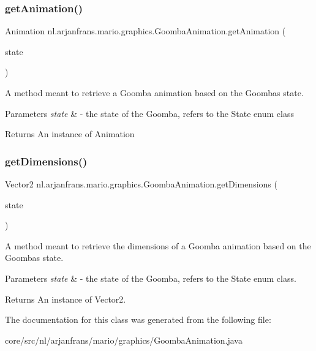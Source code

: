 \subsubsection{\texorpdfstring{get\+Animation()}{getAnimation()}}
{\footnotesize\ttfamily Animation nl.\+arjanfrans.\+mario.\+graphics.\+Goomba\+Animation.\+get\+Animation (\begin{DoxyParamCaption}\item[{State}]{state }\end{DoxyParamCaption})}



A method meant to retrieve a Goomba animation based on the Goomba\textquotesingle{}s state. 


\begin{DoxyParams}{Parameters}
{\em state} & -\/ the state of the Goomba, refers to the State enum class \\
\hline
\end{DoxyParams}
\begin{DoxyReturn}{Returns}
An instance of Animation 
\end{DoxyReturn}
\mbox{\label{classnl_1_1arjanfrans_1_1mario_1_1graphics_1_1GoombaAnimation_a49e10158e12095415ed637bc2092f546}} 
\subsubsection{\texorpdfstring{get\+Dimensions()}{getDimensions()}}
{\footnotesize\ttfamily Vector2 nl.\+arjanfrans.\+mario.\+graphics.\+Goomba\+Animation.\+get\+Dimensions (\begin{DoxyParamCaption}\item[{State}]{state }\end{DoxyParamCaption})}



A method meant to retrieve the dimensions of a Goomba animation based on the Goomba\textquotesingle{}s state. 


\begin{DoxyParams}{Parameters}
{\em state} & -\/ the state of the Goomba, refers to the State enum class. \\
\hline
\end{DoxyParams}
\begin{DoxyReturn}{Returns}
An instance of Vector2. 
\end{DoxyReturn}


The documentation for this class was generated from the following file\+:\begin{DoxyCompactItemize}
\item 
core/src/nl/arjanfrans/mario/graphics/Goomba\+Animation.\+java\end{DoxyCompactItemize}
